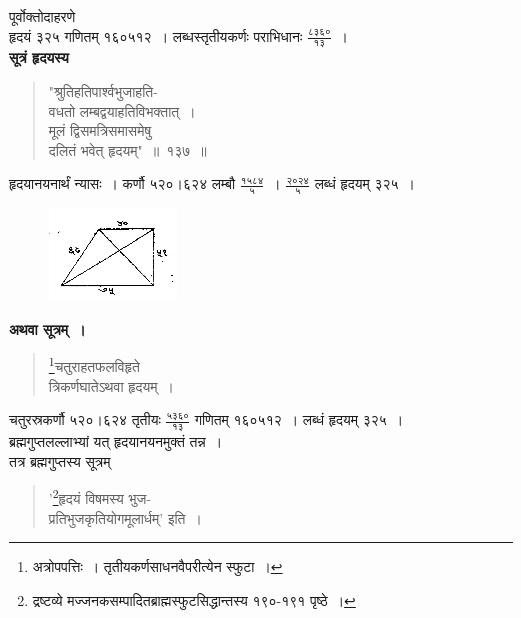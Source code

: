 \documentclass[11pt, openany]{book}
\begin{document}
पूर्वोक्तोदाहरणे\\

\vspace{-4mm}
हृदयं ३२५ गणितम् १६०५१२~। लब्धस्तृतीयकर्णः पराभिधानः $\frac{\mbox{८३६०}}{\mbox{१३}}$~।\\

\vspace{-2mm}
\textbf{सूत्रं हृदयस्य\textendash }
\begin{quote}
\bs
    "श्रुतिहतिपार्श्वभुजाहति-\\
वधतो लम्बद्वयाहतिविभक्तात्~। \\
मूलं द्विसमत्रिसमासमेषु\\
दलितं भवेत् हृदयम्"~॥~१३७~॥~
\end{quote}

हृदयानयनार्थं न्यासः~। कर्णौ ५२०।६२४ लम्बौ $\frac{\mbox{१५८४}}{\mbox{५}}$~। $\frac{\mbox{२०२४}}{\mbox{५}}$ लब्धं हृदयम् ३२५~। 
\vspace{-2mm}

\begin{figure}[h!]
    \centering
    \includegraphics[scale=0.85]{graphics/capture176.png}
\end{figure}
\vspace{-2mm}

\textbf{अथवा सूत्रम्~। }

 \label{4.138}
\begin{quote}
    \bs 
    \footnote{अत्रोपपत्तिः~। तृतीयकर्णसाधनवैपरीत्येन स्फुटा~।}चतुराहतफलविहृते\\
त्रिकर्णघातेऽथवा हृदयम्~। 
\end{quote}

\newpage%

चतुरस्रकर्णौ ५२०।६२४ तृतीयः $\frac{\mbox{५३६०}}{\mbox{१३}}$ गणितम् १६०५१२~। लब्धं हृदयम् ३२५~। \\

\vspace{-2mm}
ब्रह्मगुप्तलल्लाभ्यां यत् हृदयानयनमुक्तं तन्न~। \\

\vspace{-2mm}
तत्र ब्रह्मगुप्तस्य सूत्रम्\textendash 
\begin{quote}
    {\bq
    '\footnote{द्रष्टव्ये मज्जनकसम्पादितब्राह्मस्फुटसिद्धान्तस्य १९०-१९१ पृष्ठे~। }हृदयं विषमस्य भुज-\\
प्रतिभुजकृतियोगमूलार्धम्'} इति~। 
\end{quote} 
\end{document}
